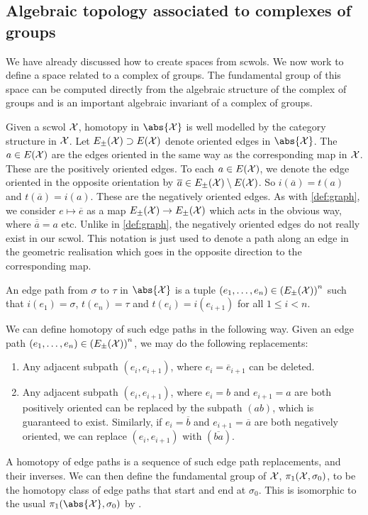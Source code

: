 \subsection{Algebraic topology associated to complexes of groups}
We have already discussed how to create spaces from scwols.
We now work to define a space related to a complex of groups.
The fundamental group of this space can be computed directly from the algebraic structure of the complex of groups and is an important algebraic invariant of a complex of groups.

Given a scwol $\mathcal{X}$, homotopy in $\abs{\calx}$ is well modelled by the category structure in $\mathcal{X}$.
Let  $E_{\pm}(\mathcal{X}) \supset E(\mathcal{X})$ denote oriented edges in $\abs{\calx}$.
The $a \in E(\mathcal{X})$ are the edges oriented in the same way as the corresponding map in $\mathcal{X}$.
These are the positively oriented edges.
To each $a \in E(\mathcal{X})$, we denote the edge oriented in the opposite orientation by $\overline{a} \in E_\pm(\mathcal{X})\setminus E(\mathcal{X})$.
So $i(\overline{a}) = t(a)$ and $t(\overline{a}) = i(a)$.
These are the negatively oriented edges.
As with \cref{def:graph}, we consider $e \mapsto \overline{e}$ as a map $E_\pm(\mathcal{X}) \to E_\pm(\mathcal{X})$ which acts in the obvious way, where  $\overline{\overline{a}}= a$ etc.
Unlike in \cref{def:graph}, the negatively oriented edges do not really exist in our scwol.
This notation is just used to denote a path along an edge in the geometric realisation which goes in the opposite direction to the corresponding map.
\begin{definition}
	An edge path from $\sigma$ to  $\tau$ in $\abs{\calx}$ is a tuple $(e_1, \ldots, e_n) \in \left(E_\pm(\mathcal{X})\right)^n$ such that $i(e_1)=\sigma$,  $t(e_n)=\tau$ and  $t(e_i) = i(e_{i+1})$ for all  $1 \leq i < n$.
	\label{def:edge_path_in_scwol}
\end{definition}
We can define homotopy of such edge paths in the following way.
Given an edge path $(e_1, \ldots, e_n) \in \left(E_\pm(\mathcal{X})\right)^n$, we may do the following replacements:
\begin{enumerate}
	\item Any adjacent subpath $(e_i,e_{i+1})$, where $e_i=\overline{e}_{i+1}$ can be deleted.
	\item Any adjacent subpath $(e_i,e_{i+1})$, where $e_i = b$ and  $e_{i+1}=a$ are both positively oriented can be replaced by the subpath $(ab)$, which is guaranteed to exist.
	      Similarly, if $e_i = \overline{b}$ and  $e_{i+1}=\overline{a}$ are both negatively oriented, we can replace $(e_i,e_{i+1})$ with  $(\overline{ba})$.
\end{enumerate}
A homotopy of edge paths is a sequence of such edge path replacements, and their inverses.
We can then define the fundamental group of $\mathcal{X}$,  $\pi_1(\mathcal{X},\sigma_0)$, to be the homotopy class of edge paths that start and end at  $\sigma_0$.
This is isomorphic to the usual $\pi_1(\abs{\calx}, \sigma_0)$ by \cite[Corollary 4.12]{hatcher_algebraic_2001}.

